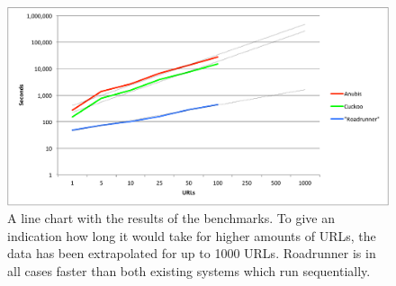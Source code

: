 \begin{figure}[h!]
    \centering
    \centerline{\includegraphics[width=15cm]{Images/chart-trend}}
    \caption{A line chart with the results of the benchmarks. To give an indication how long it would take for higher amounts of URLs, the data has been extrapolated for up to 1000 URLs. Roadrunner is in all cases faster than both existing systems which run sequentially.}
    \label{fig:chart-trend}
\end{figure}

\pagebreak

\restoregeometry
{}
\setcounter{page}{\thesavepage}
